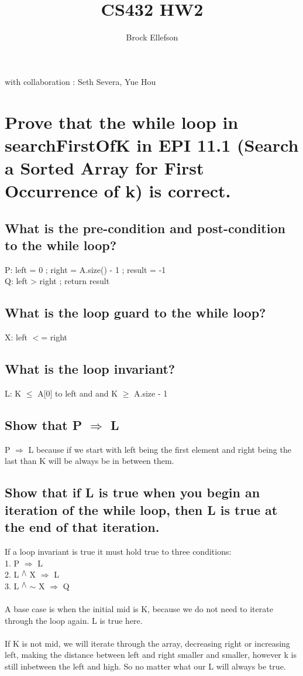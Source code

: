 \documentclass[10pt,letterpaper]{article}
\author{Brock Ellefson}
\title{CS432 HW2}
\begin{document}
\maketitle
with collaboration : Seth Severa, Yue Hou
\section{Prove that the while loop
in searchFirstOfK in EPI 11.1 (Search a Sorted
Array for First Occurrence of k) is correct.
}

\subsection{What is the pre-condition and post-condition
to the while loop?}
P: left = 0 ; right = A.size() - 1 ; result = -1 \\
Q: left > right ; return result \\

\subsection{What is the loop guard to the while loop?}
X: left $<$= right

\subsection{What is the loop invariant?}
L: K $\leq$ A[0] to left and and K $\geq$ A.size - 1
 
\subsection{Show that P $\Rightarrow$ L}
P $\Rightarrow$ L because if we start with left being the first element and right being the last than K will be always be in between them. 

\subsection{Show that if L is true when you begin an iteration
of the while loop, then L is true at the end
of that iteration.}
If a loop invariant is true it must hold true to three conditions:\\
1. P $\Rightarrow$ L \\
2. L $^{\bigwedge}$ X $\Rightarrow$ L \\
3. L $^{\bigwedge}$ $\sim$ X $\Rightarrow$ Q \\
\\
A base case is when the initial mid is K, because we do not need to iterate through the loop again. L is true here.\\
\\
If K is not mid, we will iterate through the array, decreasing right or increasing left, making the distance between left and right smaller and smaller, however k is still inbetween the left and high. So no matter what our L will always be true.
\end{document}
